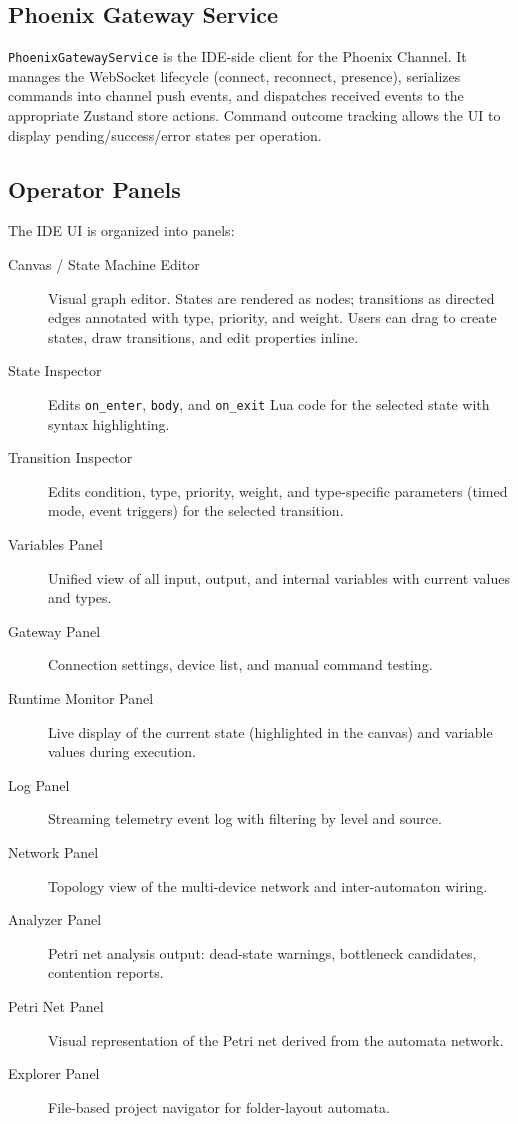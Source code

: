 \subsection{Phoenix Gateway Service}

\texttt{PhoenixGatewayService} is the IDE-side client for the Phoenix Channel. It manages the WebSocket lifecycle (connect, reconnect, presence), serializes commands into channel push events, and dispatches received events to the appropriate Zustand store actions. Command outcome tracking allows the UI to display pending/success/error states per operation.

\subsection{Operator Panels}

The IDE UI is organized into panels:

\begin{description}
  \item[Canvas / State Machine Editor] Visual graph editor. States are rendered as nodes; transitions as directed edges annotated with type, priority, and weight. Users can drag to create states, draw transitions, and edit properties inline.
  \item[State Inspector] Edits \texttt{on\_enter}, \texttt{body}, and \texttt{on\_exit} Lua code for the selected state with syntax highlighting.
  \item[Transition Inspector] Edits condition, type, priority, weight, and type-specific parameters (timed mode, event triggers) for the selected transition.
  \item[Variables Panel] Unified view of all input, output, and internal variables with current values and types.
  \item[Gateway Panel] Connection settings, device list, and manual command testing.
  \item[Runtime Monitor Panel] Live display of the current state (highlighted in the canvas) and variable values during execution.
  \item[Log Panel] Streaming telemetry event log with filtering by level and source.
  \item[Network Panel] Topology view of the multi-device network and inter-automaton wiring.
  \item[Analyzer Panel] Petri net analysis output: dead-state warnings, bottleneck candidates, contention reports.
  \item[Petri Net Panel] Visual representation of the Petri net derived from the automata network.
  \item[Explorer Panel] File-based project navigator for folder-layout automata.
\end{description}

